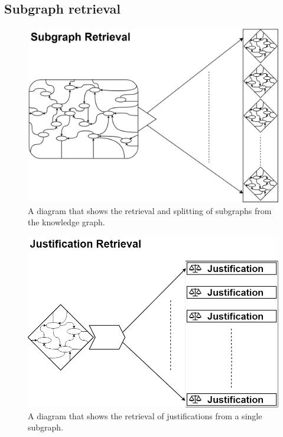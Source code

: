 \documentclass[11pt,letterpaper ,oneside ]{book}
\begin{document}
	\subsection{Subgraph retrieval}
	\begin{figure}
		\centering
		\includegraphics[width=\linewidth]{images/SubgraphRetrieval.png}
		\caption{A diagram that shows the retrieval and splitting of subgraphs from the knowledge graph.}
		\label{fig:subgraphRetrieval}
	\end{figure}
	\begin{figure}
		\centering
		\includegraphics[width=\linewidth]{images/JustificationRetrieval.png}
		\caption{A diagram that shows the retrieval of justifications from a single subgraph.}
		\label{fig:JustificationRetrieval}
	\end{figure}
	
\end{document}
